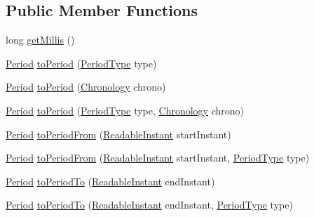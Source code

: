 \subsection*{Public Member Functions}
\begin{DoxyCompactItemize}
\item 
long \hyperlink{classorg_1_1joda_1_1time_1_1base_1_1_base_duration_a173b6c5b77abdd0da0c0b6ca4a9ac390}{get\-Millis} ()
\item 
\hyperlink{classorg_1_1joda_1_1time_1_1_period}{Period} \hyperlink{classorg_1_1joda_1_1time_1_1base_1_1_base_duration_a10cfcfa1642d10efd5de3aab67e6ac9b}{to\-Period} (\hyperlink{classorg_1_1joda_1_1time_1_1_period_type}{Period\-Type} type)
\item 
\hyperlink{classorg_1_1joda_1_1time_1_1_period}{Period} \hyperlink{classorg_1_1joda_1_1time_1_1base_1_1_base_duration_a771ad473e4a521af8c426e5ed9e1459f}{to\-Period} (\hyperlink{classorg_1_1joda_1_1time_1_1_chronology}{Chronology} chrono)
\item 
\hyperlink{classorg_1_1joda_1_1time_1_1_period}{Period} \hyperlink{classorg_1_1joda_1_1time_1_1base_1_1_base_duration_af16d27067ca398eb439f429559ba5217}{to\-Period} (\hyperlink{classorg_1_1joda_1_1time_1_1_period_type}{Period\-Type} type, \hyperlink{classorg_1_1joda_1_1time_1_1_chronology}{Chronology} chrono)
\item 
\hyperlink{classorg_1_1joda_1_1time_1_1_period}{Period} \hyperlink{classorg_1_1joda_1_1time_1_1base_1_1_base_duration_a570176c4cb48cb8251789bb4796e4012}{to\-Period\-From} (\hyperlink{interfaceorg_1_1joda_1_1time_1_1_readable_instant}{Readable\-Instant} start\-Instant)
\item 
\hyperlink{classorg_1_1joda_1_1time_1_1_period}{Period} \hyperlink{classorg_1_1joda_1_1time_1_1base_1_1_base_duration_af8e65ea3dc990cdae5517cbfdb58f7ad}{to\-Period\-From} (\hyperlink{interfaceorg_1_1joda_1_1time_1_1_readable_instant}{Readable\-Instant} start\-Instant, \hyperlink{classorg_1_1joda_1_1time_1_1_period_type}{Period\-Type} type)
\item 
\hyperlink{classorg_1_1joda_1_1time_1_1_period}{Period} \hyperlink{classorg_1_1joda_1_1time_1_1base_1_1_base_duration_a6c83efa3074dd1ea9928b2531a06cce4}{to\-Period\-To} (\hyperlink{interfaceorg_1_1joda_1_1time_1_1_readable_instant}{Readable\-Instant} end\-Instant)
\item 
\hyperlink{classorg_1_1joda_1_1time_1_1_period}{Period} \hyperlink{classorg_1_1joda_1_1time_1_1base_1_1_base_duration_a7bbdb732bd32ca2f97595c0823bb9855}{to\-Period\-To} (\hyperlink{interfaceorg_1_1joda_1_1time_1_1_readable_instant}{Readable\-Instant} end\-Instant, \hyperlink{classorg_1_1joda_1_1time_1_1_period_type}{Period\-Type} type)

\end{DoxyCompactItemize}
